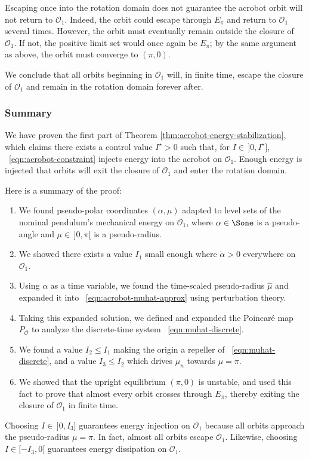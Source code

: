 Escaping once into the rotation domain does not guarantee the acrobot
orbit will not return to \(\mathcal{O}_1\).
Indeed, the orbit could escape through \(E_\pi\) and return to \(\mathcal{O}_1\)
several times.
However, the orbit must eventually remain outside the closure of 
\(\mathcal{O}_1\). 
If not, the positive limit set would once again be
\(E_\pi\); by the same argument as above, the orbit must converge to 
\((\pi,0)\).

We conclude that all orbits beginning in \(\mathcal{O}_1\) will, in finite time,
escape the closure of \(\mathcal{O}_1\) and remain in the rotation domain
forever after.

\subsubsection*{Summary}

We have proven the first part of Theorem \ref{thm:acrobot-energy-stabilization},
which claims there exists a control value \(I^\star > 0\) such that, for 
\(I \in \, ]0,I^\star]\), ~\eqref{eqn:acrobot-constraint} injects energy into
the acrobot on \(\mathcal{O}_1\).
Enough energy is injected that orbits will exit the closure of \(\mathcal{O}_1\)
and enter the rotation domain.

Here is a summary of the proof:
\begin{enumerate}
    \item We found pseudo-polar coordinates \((\alpha,\mu)\) adapted to level
        sets of the nominal pendulum's mechanical energy on \(\mathcal{O}_1\),
        where \(\alpha \in \Sone\) is a pseudo-angle and \(\mu \in \, ]0,\pi[\)
        is a pseudo-radius.
    \item We showed there exists a value \(I_1\) small enough where 
        \(\dot{\alpha} > 0\) everywhere on \(\mathcal{O}_1\).
    \item Using \(\alpha\) as a time variable, we found the time-scaled
        pseudo-radius \(\hat{\mu}\) and expanded it into
        ~\eqref{eqn:acrobot-muhat-approx} using perturbation theory.
    \item Taking this expanded solution, we defined and expanded the
        Poincar\'{e} map \(P_\mathcal{O}\) to analyze the discrete-time system
        ~\eqref{eqn:muhat-discrete}.
    \item We found a value \(I_2 \leq I_1\) making the origin a repeller of 
        ~\eqref{eqn:muhat-discrete}, and a value \(I_3 \leq I_2\) which drives
        \(\mu_n\) towards \(\mu = \pi\).
    \item We showed that the upright equilibrium \((\pi,0)\) is unstable, and
        used this fact to prove that almost every orbit crosses through
        \(E_\pi\), thereby exiting the closure of \(\mathcal{O}_1\) in finite
        time.
\end{enumerate}
Choosing \(I \in \,]0,I_3]\) guarantees energy injection on
\(\mathcal{O}_1\) because all orbits approach the pseudo-radius \(\mu = \pi\).
In fact, almost all orbits escape \(\bar{\mathcal{O}}_1\).
Likewise, choosing \(I \in [-I_3,0[\) guarantees energy dissipation on
\(\mathcal{O}_1\).

